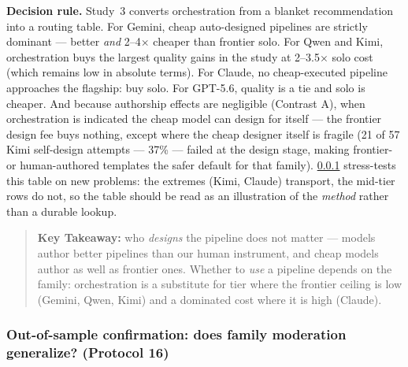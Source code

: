 \documentclass[12pt,a4paper]{article}
\begin{document}
\textbf{Decision rule.} Study~3 converts orchestration from a blanket
recommendation into a routing table. For Gemini, cheap auto-designed pipelines
are strictly dominant --- better \emph{and} 2--4$\times$ cheaper than frontier
solo. For Qwen and Kimi, orchestration buys the largest quality gains in the
study at 2--3.5$\times$ solo cost (which remains low in absolute terms).
For Claude, no cheap-executed pipeline approaches the flagship: buy solo.
For GPT-5.6, quality is a tie and solo is cheaper. And because authorship
effects are negligible (Contrast A), when orchestration is indicated the cheap
model can design for itself --- the frontier design fee buys nothing, except
where the cheap designer itself is fragile (21 of 57 Kimi self-design attempts
--- 37\% --- failed at the design stage, making frontier- or human-authored
templates the safer default for that family). \cref{sec:study3conf} stress-tests this table on new problems:
the extremes (Kimi, Claude) transport, the mid-tier rows do not, so the table
should be read as an illustration of the \emph{method} rather than a durable
lookup.

\begin{quote}
\textbf{Key Takeaway:} who \emph{designs} the pipeline does not matter ---
models author better pipelines than our human instrument, and cheap models
author as well as frontier ones. Whether to \emph{use} a pipeline depends on
the family: orchestration is a substitute for tier where the frontier ceiling
is low (Gemini, Qwen, Kimi) and a dominated cost where it is high (Claude).
\end{quote}

\subsubsection{Out-of-sample confirmation: does family moderation generalize? (Protocol 16)}\label{sec:study3conf}
\end{document}
